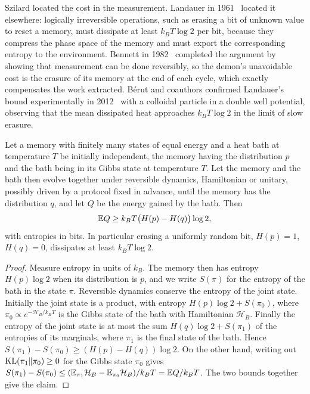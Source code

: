 Szilard located the cost in the measurement. Landauer in 1961~\cite{landauer1961} located it elsewhere: logically irreversible operations, such as erasing a bit of unknown value to reset a memory, must dissipate at least $k_BT\log2$ per bit, because they compress the phase space of the memory and must export the corresponding entropy to the environment. Bennett in 1982~\cite{bennett1982} completed the argument by showing that measurement can be done reversibly, so the demon's unavoidable cost is the erasure of its memory at the end of each cycle, which exactly compensates the work extracted. B\'erut and coauthors confirmed Landauer's bound experimentally in 2012~\cite{berut2012} with a colloidal particle in a double well potential, observing that the mean dissipated heat approaches $k_BT\log2$ in the limit of slow erasure.

\begin{theorem}\label{thm:landauer}
Let a memory with finitely many states of equal energy and a heat bath at temperature $T$ be initially independent, the memory having the distribution $p$ and the bath being in its Gibbs state at temperature $T$. Let the memory and the bath then evolve together under reversible dynamics, Hamiltonian or unitary, possibly driven by a protocol fixed in advance, until the memory has the distribution $q$, and let $Q$ be the energy gained by the bath. Then
\[
\mathbb{E} Q\geq k_BT\big(H(p)-H(q)\big)\log2,
\]
with entropies in bits. In particular erasing a uniformly random bit, $H(p) = 1$, $H(q) = 0$, dissipates at least $k_BT\log2$.
\end{theorem}

\begin{proof}
Measure entropy in units of $k_B$. The memory then has entropy $H(p)\log2$ when its distribution is $p$, and we write $S(\pi)$ for the entropy of the bath in the state $\pi$. Reversible dynamics conserve the entropy of the joint state. Initially the joint state is a product, with entropy $H(p)\log2+S(\pi_0)$, where $\pi_0\propto e^{-\mathcal H_B/k_BT}$ is the Gibbs state of the bath with Hamiltonian $\mathcal H_B$. Finally the entropy of the joint state is at most the sum $H(q)\log2+S(\pi_1)$ of the entropies of its marginals, where $\pi_1$ is the final state of the bath. Hence $S(\pi_1)-S(\pi_0)\geq(H(p)-H(q))\log2$. On the other hand, writing out $\mathrm{KL}(\pi_1\|\pi_0)\geq0$ for the Gibbs state $\pi_0$ gives $S(\pi_1)-S(\pi_0)\leq(\mathbb{E}_{\pi_1}\mathcal H_B-\mathbb{E}_{\pi_0}\mathcal H_B)/k_BT = \mathbb{E} Q/k_BT$. The two bounds together give the claim.
\end{proof}


